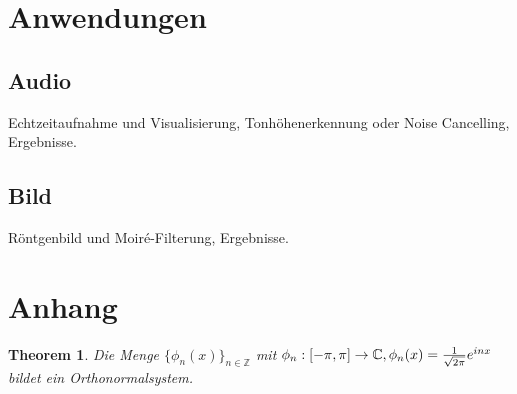 \documentclass[a4paper,12pt]{article}
\newtheorem{theorem}{Theorem}[section]
\theoremstyle{definition}
\theoremstyle{remark}
\begin{document}
\section{Anwendungen}
\subsection{Audio}
Echtzeitaufnahme und Visualisierung, Tonhöhenerkennung oder Noise Cancelling, Ergebnisse.
\subsection{Bild}
Röntgenbild und Moiré-Filterung, Ergebnisse.

\section{Anhang}
\begin{theorem}\label{thm:orthonorm}
Die Menge $\{\phi_n(x)\}_{n\in\mathbb{Z}}$ mit $\phi_n:[-\pi, \pi] \to \mathbb{C}, \\ \phi_n(x) = \frac{1}{\sqrt{2\pi}}e^{inx}$ bildet ein Orthonormalsystem.
\end{theorem}
\end{document}
